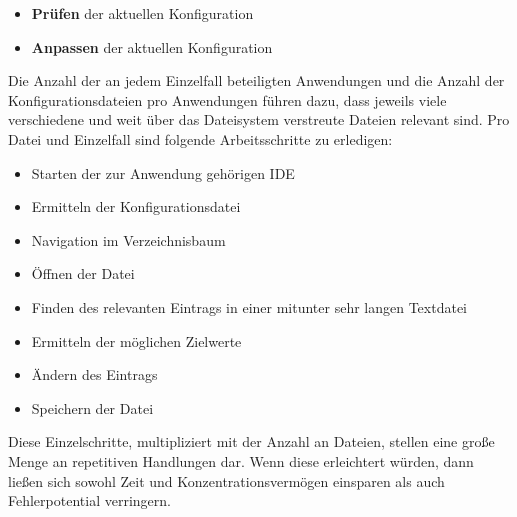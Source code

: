 \begin{itemize}
    \item \textbf{Prüfen} der aktuellen Konfiguration
    \item \textbf{Anpassen} der aktuellen Konfiguration
\end{itemize}

Die Anzahl der an jedem Einzelfall beteiligten Anwendungen und die Anzahl der
Konfigurationsdateien pro Anwendungen führen dazu, dass jeweils viele verschiedene
und weit über das Dateisystem verstreute Dateien relevant sind. Pro Datei und
Einzelfall sind folgende Arbeitsschritte zu erledigen:

\begin{itemize}
    \item Starten der zur Anwendung gehörigen \gls{IDE}
    \item Ermitteln der Konfigurationsdatei
    \item Navigation im Verzeichnisbaum
    \item Öffnen der Datei
    \item Finden des relevanten Eintrags in einer mitunter sehr langen Textdatei
    \item Ermitteln der möglichen Zielwerte
    \item Ändern des Eintrags
    \item Speichern der Datei
\end{itemize}

Diese Einzelschritte, multipliziert mit der Anzahl an Dateien, stellen eine
große Menge an repetitiven Handlungen dar. Wenn diese erleichtert würden, dann
ließen sich sowohl Zeit und Konzentrationsvermögen einsparen als auch Fehlerpotential
verringern.